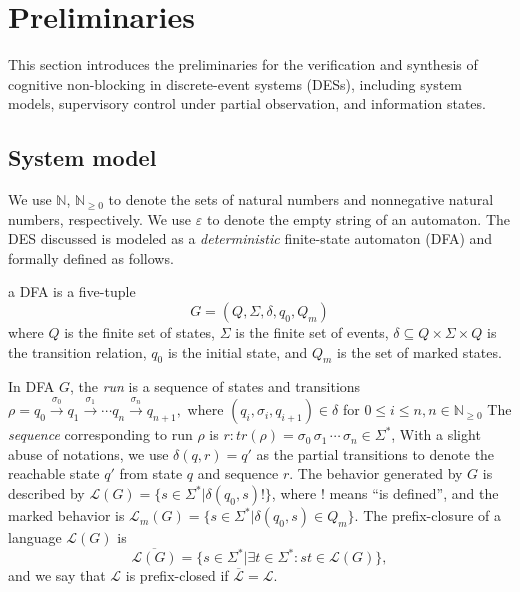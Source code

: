 \documentclass[journal,twoside,web]{ieeecolor}
\begin{document}
\section{Preliminaries}\label{sec:prelimi}

This section introduces the preliminaries for the verification and synthesis of cognitive non-blocking in discrete-event systems (DESs), including system models, supervisory control under partial observation, and information states.


\subsection{System model}

We use $\mathbb{N}$, $\mathbb{N}_{\geq 0}$ to denote the sets of natural numbers and nonnegative natural numbers, respectively. 
We use $\varepsilon$ to denote the empty string of an automaton. 
%
The DES discussed is modeled as a \emph{deterministic} finite-state automaton (DFA) and formally defined as follows.
\begin{definition}
    a DFA is a five-tuple
    $$
        G = (Q, \Sigma, \delta, q_0, Q_m)
    $$
    where
    $Q$ is the finite set of states, $\Sigma$ is the finite set of events, 
    $\delta \subseteq Q \times \Sigma \times Q$ is the transition relation,
    $q_0$ is the initial state, and
    $Q_m$ is the set of marked states.
    \label{def:DFA}
\end{definition}
%
In DFA $G$, the \emph{run} is a sequence of states and transitions
$
\rho = q_0 \xrightarrow[]{\sigma_0} q_1 \xrightarrow[]{\sigma_1} \cdots q_n \xrightarrow[]{\sigma_n} q_{n+1},
$
where $(q_{i}, \sigma_i, q_{i+1}) \in \delta$ for $0 \leq i \leq n, n \in \mathbb{N}_{\geq 0}$
The \emph{sequence} corresponding to run $\rho$ is 
$r : tr(\rho) = \sigma_0 \, \sigma_1 \, \cdots \, \sigma_n \in \Sigma^*$,
%
With a slight abuse of notations, we use $\delta(q, r) = q'$ as the partial transitions to denote the reachable state $q'$ from state $q$ and sequence $r$.
%
The behavior generated by $G$ is described by 
$\mathcal{L}(G) = \{ s \in \Sigma^* | \delta(q_0, s)! \}$, 
where $!$ means ``is defined'', and the marked behavior is 
$\mathcal{L}_m(G) = \{ s \in \Sigma^* | \delta(q_0, s) \in Q_m \}$. 
The prefix-closure of a language $\mathcal{L}(G)$ is
$$
\overline{\mathcal{L}(G)} = \{ s \in \Sigma^* | \exists t \in \Sigma^* : st \in \mathcal{L}(G) \},
$$
and we say that $\mathcal{L}$ is prefix-closed if $\overline{\mathcal{L}} = \mathcal{L}$.
\end{document}
